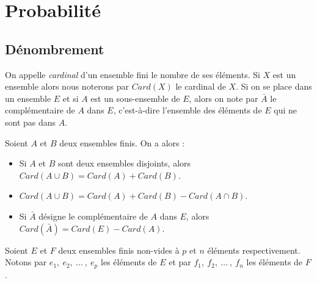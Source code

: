 
\TCDLessonStyleOn
\chapter{Probabilit\'e}
\newcommand{\card}[1]{\text{Card }#1}
\newcommand{\A}[2]{A_{#1}^{#2}}
\newcommand{\C}[2]{C_{#1}^{#2}}
      \section{D\'enombrement}
            \begin{defi}
            On appelle \emph{cardinal} d'un ensemble fini le nombre de ses \'el\'ements.
            Si $X$ est un ensemble alors nous noterons par $Card(X)$ le cardinal de $X$.
            Si on se place dans un ensemble $E$ et si $A$ est un sous-ensemble de $E$, alors on note par $\bar{A}$ le compl\'ementaire de $A$ dans $E$, c'est-\`a-dire l'ensemble des \'el\'ements de $E$ qui ne sont pas dans $A$. 
            \end{defi}
            \begin{prp}
            Soient $A$ et $B$ deux ensembles finis. On a alors :
            \begin{itemize}
                  \item Si $A$ et $B$ sont deux ensembles disjoints, alors $Card(A \cup B) = Card(A) + Card(B)$.
                  \item $Card(A \cup B) = Card(A) + Card(B) - Card(A \cap B)$.
                  \item Si $\bar{A}$ d\'esigne le compl\'ementaire de $A$ dans $E$, alors $Card(\bar{A}) = Card(E) - Card(A)$.
            \end{itemize}
            \end{prp}
            Soient $E$ et $F$ deux ensembles finis non-vides \`a $p$ et $n$ \'el\'ements respectivement.
            Notons par $e_1,\ e_2,\ \ldots\ ,\ e_p$ les \'el\'ements de $E$ 
            et par  $f_1,\ f_2,\ \ldots\ ,\ f_n$ les \'el\'ements de $F$. 

